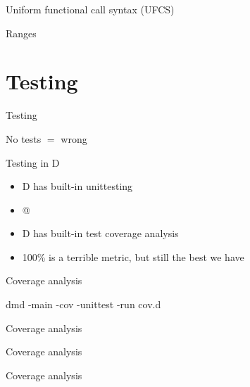 \documentclass[aspectratio=169,notes]{beamer}
\begin{document}
	\begin{frame}[fragile]{Uniform functional call syntax (UFCS)}
		
	\end{frame}

	\begin{frame}[fragile]{Ranges}
		
	\end{frame}

	\section{Testing}
	\begin{frame}[fragile]{Testing}
		\begin{center}
		\Large No tests $=$ wrong
		\end{center}
	\end{frame}

	\begin{frame}[fragile]{Testing in D}
		\begin{itemize}
			\item D has built-in unittesting
			\item \lstinline@unittest { }@
			\item D has built-in test coverage analysis
			\item 100\% is a terrible metric, but still the best we have
		\end{itemize}
	\end{frame}

	\begin{frame}[fragile]{Coverage analysis}
		
		dmd -main -cov -unittest -run cov.d
	\end{frame}

	\begin{frame}[fragile]{Coverage analysis}
		
	\end{frame}

	\begin{frame}[fragile]{Coverage analysis}
		
	\end{frame}

	\begin{frame}[fragile]{Coverage analysis}
		
	\end{frame}
\end{document}
